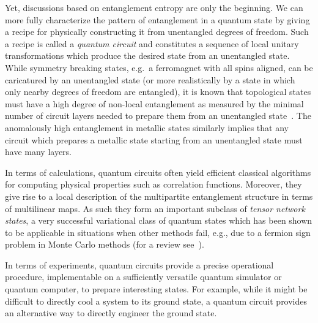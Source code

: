 \documentclass[aps,pra,reprint,superscriptaddress,floatfix,amsmath,amssymb,amsfonts]{revtex4-1}
\begin{document}
Yet, discussions based on entanglement entropy are only the beginning.
We can more fully characterize the pattern of entanglement in a quantum state by giving a recipe for physically constructing it from unentangled degrees of freedom.
Such a recipe is called a \emph{quantum circuit} and constitutes a sequence of local unitary transformations which produce the desired state from an unentangled state.
While symmetry breaking states, e.g.~a ferromagnet with all spins aligned, can be caricatured by an unentangled state (or more realistically by a state in which only nearby degrees of freedom are entangled), it is known that topological states must have a high degree of non-local entanglement as measured by the minimal number of circuit layers needed to prepare them from an unentangled state~\cite{bravyi2006topogeneration}.
The anomalously high entanglement in metallic states similarly implies that any circuit which prepares a metallic state starting from an unentangled state must have many layers.

In terms of calculations, quantum circuits often yield efficient classical algorithms for computing physical properties such as correlation functions. Moreover, they give rise to a local description of the multipartite entanglement structure in terms of multilinear maps. As such they form an important subclass of \emph{tensor network states}, a very successful variational class of quantum states which has been shown to be applicable in situations when other methods fail, e.g., due to a fermion sign problem in Monte Carlo methods (for a review see~\cite{murg2009tnsreview,orus2014tnsreview}).

In terms of experiments, quantum circuits provide a precise operational procedure, implementable on a sufficiently versatile quantum simulator or quantum computer, to prepare interesting states. For example, while it might be difficult to directly cool a system to its ground state, a quantum circuit provides an alternative way to directly engineer the ground state.
\end{document}

